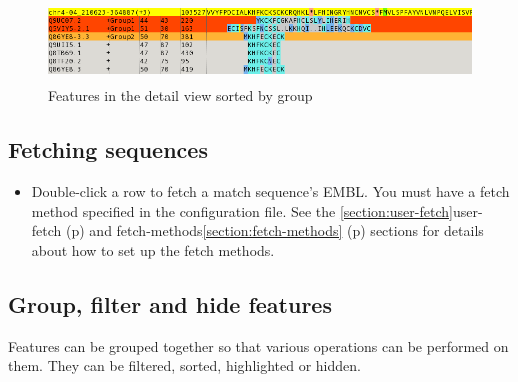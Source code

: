 \documentclass[letterpaper]{article}
\newcommand\liststyleWWviiiNumxvi{%
\renewcommand\labelitemi{{\textbullet}}
\renewcommand\labelitemii{o}
\renewcommand\labelitemiii{[F0A7?]}
\renewcommand\labelitemiv{[F0B7?]}
}
\begin{document}
\begin{figure}
\centering
\color[rgb]{0.30980393,0.5058824,0.7411765}
\includegraphics[width=13.721cm,height=2.164cm]{img_view_sort_by_group.png}
\caption{Features in the detail view sorted by group}
\end{figure}

\bigskip

{\color[rgb]{0.30980393,0.5058824,0.7411765}\subsection[Fetching sequences]{Fetching sequences}}
\hypertarget{RefHeading2021056909880}{}

\liststyleWWviiiNumxvi
\begin{itemize}
\item {Double-click a row to fetch a match sequence{\textquoteright}s EMBL. You must have a fetch method specified in the configuration file. See the \ref{section:user-fetch}user-fetch (p\pageref{section:user-fetch}) and fetch-methods\ref{section:fetch-methods} (p\pageref{section:fetch-methods}) sections for details about how to set up the fetch methods. }
\end{itemize}

{\color[rgb]{0.30980393,0.5058824,0.7411765}
\subsection[Group, filter and hide features]{Group, filter and hide features}}
\hypertarget{RefHeading2041056909880}{}

{Features can be grouped together so that various operations can be performed on them. They can be filtered, sorted, highlighted or hidden.}
\end{document}
